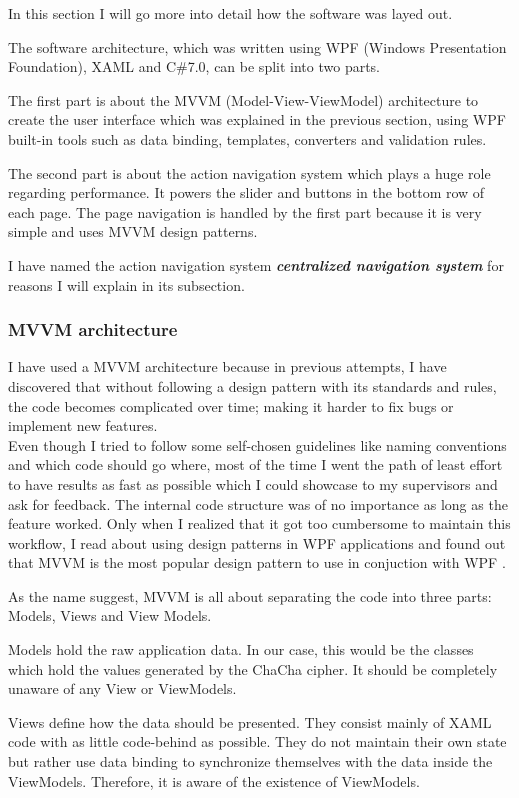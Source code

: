 In this section I will go more into detail how the software was layed out.

The software architecture, which was written using WPF (Windows Presentation Foundation), XAML and C\#7.0, can be split into two parts.

The first part is about the MVVM (Model-View-ViewModel) architecture to create the user interface which was explained in the previous section, using WPF built-in tools such as data binding, templates, converters and validation rules.

The second part is about the action navigation system which plays a huge role regarding performance. It powers the slider and buttons in the bottom row of each page. The page navigation is handled by the first part because it is very simple and uses MVVM design patterns.

I have named the action navigation system \textit{\textbf{centralized navigation system}} for reasons I will explain in its subsection.

\subsubsection{MVVM architecture}

I have used a MVVM architecture because in previous attempts, I have discovered that without following a design pattern with its standards and rules, the code becomes complicated over time; making it harder to fix bugs or implement new features. \\
Even though I tried to follow some self-chosen guidelines like naming conventions and which code should go where, most of the time I went the path of least effort to have results as fast as possible which I could showcase to my supervisors and ask for feedback. The internal code structure was of no importance as long as the feature worked. Only when I realized that it got too cumbersome to maintain this workflow, I read about using design patterns in WPF applications and found out that MVVM is the most popular design pattern to use in conjuction with WPF \cite{mvvm-wpf}.

As the name suggest, MVVM is all about separating the code into three parts: Models, Views and View Models.

Models hold the raw application data. In our case, this would be the classes which hold the values generated by the ChaCha cipher. It should be completely unaware of any View or ViewModels.

Views define how the data should be presented. They consist mainly of XAML code with as little code-behind as possible. They do not maintain their own state but rather use data binding to synchronize themselves with the data inside the ViewModels. Therefore, it is aware of the existence of ViewModels.

